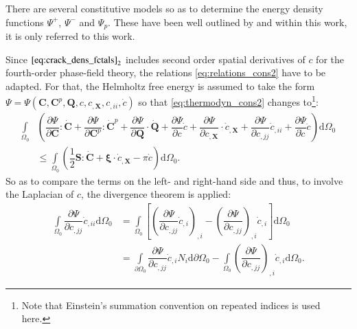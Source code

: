 There are several constitutive models so as to determine the energy density functions $\Psi^{+}$, $\Psi^{-}$ and $\Psi_{p}$. These have been well outlined by \citet{03_PF_ductile} and within this work, it is only referred to this work. 

Since $\eqref{eq:crack_dens_fctals}_{2}$ includes second order spatial derivatives of $c$ for the fourth-order phase-field theory, the relations \eqref{eq:relations_cons2} have to be adapted. For that, the Helmholtz free energy is assumed to take the form $\Psi=\Psi\left(\mathbf{C},\mathbf{C}^{p},\mathbf{Q},c,c_{,\mathbf{X}},c_{,ii},\dot{c}\right)$ so that \eqref{eq:thermodyn_cons2} changes to\footnote{Note that Einstein's summation convention on repeated indices is used here.}:
\begin{equation} \label{eq:thermodyn_cons4}
	\begin{aligned}
	\int\limits_{\Omega_{0}}&\left(\dfrac{\partial\Psi}{\partial\mathbf{C}}:\dot{\mathbf{C}}+\dfrac{\partial\Psi}{\partial\mathbf{C}^{p}}:\dot{\mathbf{C}}^{p}+\dfrac{\partial\Psi}{\partial\mathbf{Q}}\cdot\dot{\mathbf{Q}}+\dfrac{\partial\Psi}{\partial c}\dot{c}+\dfrac{\partial\Psi}{\partial c_{,\mathbf{X}}}\cdot\dot{c}_{,\mathbf{X}}+\dfrac{\partial\Psi}{\partial c_{,jj}}\dot{c}_{,ii}+\dfrac{\partial\Psi}{\partial\dot{c}}\ddot{c}\right)\mathrm{d}\Omega_{0} \\
	&\leq \int\limits_{\Omega_{0}}\left(\dfrac{1}{2}\mathbf{S}:\dot{\mathbf{C}}+\bm{\xi}\cdot\dot{c}_{,\mathbf{X}}-\pi\dot{c}\right)\mathrm{d}\Omega_{0}.
	\end{aligned}
\end{equation}
So as to compare the terms on the left- and right-hand side and thus, to involve the Laplacian of $c$, the divergence theorem is applied:
\begin{equation} \label{eq:div_theorem_Lapl_c}
	\begin{aligned}
		\int\limits_{\Omega_{0}}\dfrac{\partial\Psi}{\partial c_{,jj}}\dot{c}_{,ii}\mathrm{d}\Omega_{0} &= \int\limits_{\Omega_{0}}\left[\left(\dfrac{\partial\Psi}{\partial c_{,jj}}\dot{c}_{,i}\right)_{,i}-\left(\dfrac{\partial\Psi}{\partial c_{,jj}}\right)_{,i}\dot{c}_{,i}\right]\mathrm{d}\Omega_{0} \\
		&= \int\limits_{\partial\Omega_{0}}\dfrac{\partial\Psi}{\partial c_{,jj}}\dot{c}_{,i}N_{i}\mathrm{d}\partial\Omega_{0}-\int\limits_{\Omega_{0}}\left(\dfrac{\partial\Psi}{\partial c_{,jj}}\right)_{,i}\dot{c}_{,i}\mathrm{d}\Omega_{0}.
	\end{aligned}
\end{equation}
